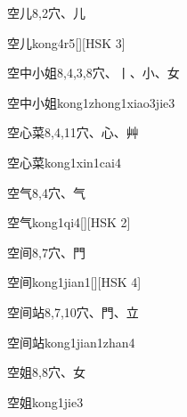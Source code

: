 \begin{entry}{空儿}{8,2}{⽳、⼉}
  \begin{phonetics}{空儿}{kong4r5}[][HSK 3]
  \end{phonetics}
\end{entry}

\begin{entry}{空中小姐}{8,4,3,8}{⽳、⼁、⼩、⼥}
  \begin{phonetics}{空中小姐}{kong1zhong1xiao3jie3}
  \end{phonetics}
\end{entry}

\begin{entry}{空心菜}{8,4,11}{⽳、⼼、⾋}
  \begin{phonetics}{空心菜}{kong1xin1cai4}
  \end{phonetics}
\end{entry}

\begin{entry}{空气}{8,4}{⽳、⽓}
  \begin{phonetics}{空气}{kong1qi4}[][HSK 2]
  \end{phonetics}
\end{entry}

\begin{entry}{空间}{8,7}{⽳、⾨}
  \begin{phonetics}{空间}{kong1jian1}[][HSK 4]
  \end{phonetics}
\end{entry}

\begin{entry}{空间站}{8,7,10}{⽳、⾨、⽴}
  \begin{phonetics}{空间站}{kong1jian1zhan4}
  \end{phonetics}
\end{entry}

\begin{entry}{空姐}{8,8}{⽳、⼥}
  \begin{phonetics}{空姐}{kong1jie3}
  \end{phonetics}
\end{entry}

